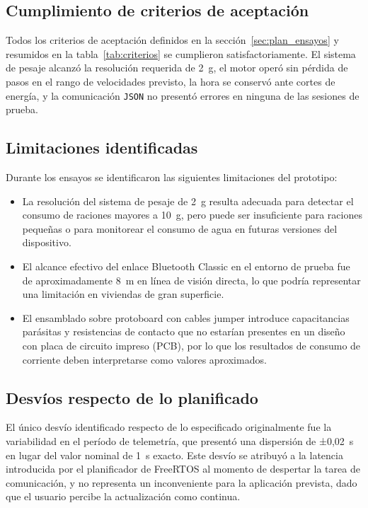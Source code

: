 \subsection{Cumplimiento de criterios de aceptación}

Todos los criterios de aceptación definidos en la sección~\ref{sec:plan_ensayos}
y resumidos en la tabla~\ref{tab:criterios} se cumplieron satisfactoriamente.
El sistema de pesaje alcanzó la resolución requerida de 2~g,
el motor operó sin pérdida de pasos en el rango de velocidades previsto, la hora
se conservó ante cortes de energía, y la comunicación \texttt{JSON} no presentó errores
en ninguna de las sesiones de prueba.

\newpage
\subsection{Limitaciones identificadas}

Durante los ensayos se identificaron las siguientes limitaciones del prototipo:

\begin{itemize}
    \item La resolución del sistema de pesaje de 2~g resulta adecuada para
    detectar el consumo de raciones mayores a 10~g, pero puede ser insuficiente
    para raciones pequeñas o para monitorear el consumo de agua en futuras
    versiones del dispositivo.
    \item El alcance efectivo del enlace Bluetooth Classic en el entorno de prueba
    fue de aproximadamente 8~m en línea de visión directa, lo que podría
    representar una limitación en viviendas de gran superficie.
    \item El ensamblado sobre protoboard con cables jumper
    introduce capacitancias parásitas y resistencias de contacto que no estarían presentes en un diseño con placa de circuito impreso (PCB), por lo que los
    resultados de consumo de corriente deben interpretarse como valores
    aproximados.
\end{itemize}

\subsection{Desvíos respecto de lo planificado}

El único desvío identificado respecto de lo especificado originalmente fue la
variabilidad en el período de telemetría, que presentó una dispersión de
±0,02~s en lugar del valor nominal de 1~s exacto. Este desvío se atribuyó a la
latencia introducida por el planificador de FreeRTOS al momento de despertar la
tarea de comunicación, y no representa un inconveniente para la aplicación
prevista, dado que el usuario percibe la actualización como continua.
